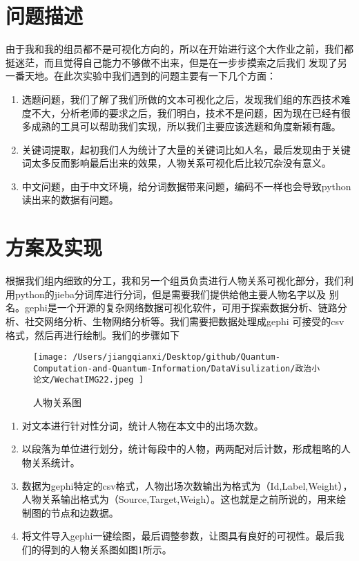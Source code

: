 \documentclass[UTF8]{ctexart}
\begin{document}
\section{问题描述}
\par{由于我和我的组员都不是可视化方向的，所以在开始进行这个大作业之前，我们都挺迷茫，而且觉得自己能力不够做不出来，但是在一步步摸索之后我们
发现了另一番天地。在此次实验中我们遇到的问题主要有一下几个方面：
}
\begin{enumerate}[(1)]
	\item 选题问题，我们了解了我们所做的文本可视化之后，发现我们组的东西技术难度不大，分析老师的要求之后，我们明白，技术不是问题，因为现在已经有很多成熟的工具可以帮助我们实现，所以我们主要应该选题和角度新颖有趣。
	\item 关键词提取，起初我们人为统计了大量的关键词比如人名，最后发现由于关键词太多反而影响最后出来的效果，人物关系可视化后比较冗杂没有意义。
	\item 中文问题，由于中文环境，给分词数据带来问题，编码不一样也会导致python读出来的数据有问题。
\end{enumerate}
\section{方案及实现}
\par{
根据我们组内细致的分工，我和另一个组员负责进行人物关系可视化部分，我们利用python的jieba分词库进行分词，但是需要我们提供给他主要人物名字以及
别名。gephi是一个开源的复杂网络数据可视化软件，可用于探索数据分析、链路分析、社交网络分析、生物网络分析等。我们需要把数据处理成gephi
可接受的csv格式，然后再进行绘制。我们的步骤如下
\begin{figure}[h]
	\centering
	\texttt{[image: /Users/jiangqianxi/Desktop/github/Quantum-Computation-and-Quantum-Information/DataVisulization/政治小论文/WechatIMG22.jpeg ]}
	\caption{人物关系图}
	\end{figure}
\begin{enumerate}[(1)]
	\item 对文本进行针对性分词，统计人物在本文中的出场次数。
	\item 以段落为单位进行划分，统计每段中的人物，两两配对后计数，形成粗略的人物关系统计。
	\item 数据为gephi特定的csv格式，人物出场次数输出为格式为（Id,Label,Weight），人物关系输出格式为（Source,Target,Weigh）。这也就是之前所说的，用来绘制图的节点和边数据。
	\item 将文件导入gephi一键绘图，最后调整参数，让图具有良好的可视性。最后我们的得到的人物关系图如图1所示。
\end{enumerate}

}
\par{

}
\end{document}
